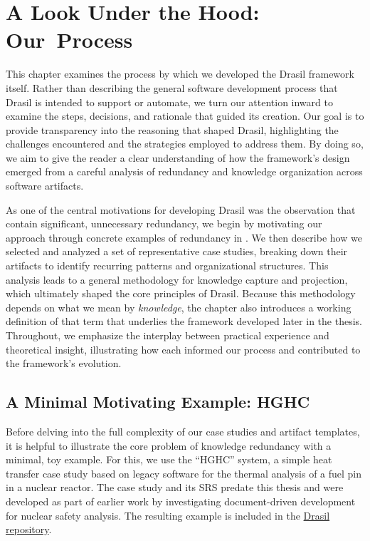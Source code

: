 \chapter{A Look Under the Hood: \mbox{Our Process}}
\label{c:process}

This chapter examines the process by which we developed the Drasil 
framework itself. Rather than describing the general software development 
process that Drasil is intended to support or automate, we turn our attention 
inward to examine the steps, decisions, and rationale that guided its creation. 
Our goal is to provide transparency into the reasoning that shaped Drasil, 
highlighting the challenges encountered and the strategies employed to address 
them. By doing so, we aim to give the reader a clear understanding of how the 
framework's design emerged from a careful analysis of redundancy and knowledge 
organization across software artifacts.

As one of the central motivations for developing Drasil was the observation 
that \sfs{} contain significant, unnecessary redundancy, we begin by motivating 
our approach through concrete examples of redundancy in \sfs{}. We then 
describe how we selected and analyzed a set of representative case studies, 
breaking down their artifacts to identify recurring patterns and organizational 
structures. This analysis leads to a general methodology for knowledge capture 
and projection, which ultimately shaped the core principles of Drasil. 
Because this methodology depends on what we mean by \emph{knowledge}, the 
chapter also introduces a working definition of that term that underlies the 
framework developed later in the thesis. 
Throughout, we emphasize the interplay between practical experience and 
theoretical insight, illustrating how each informed our process and contributed 
to the framework's evolution.

\section{A Minimal Motivating Example: HGHC}
\label{sec:hghc-mini}

Before delving into the full complexity of our case studies and artifact
templates, it is helpful to illustrate the core problem of knowledge redundancy
with a minimal, toy example. For this, we use the ``HGHC'' system, a simple heat
transfer case study based on legacy software for the thermal analysis of a fuel
pin in a nuclear reactor. The case study and its SRS predate this thesis and
were developed as part of earlier work by \citet{SmithAndKoothoor2016}
investigating document-driven development for nuclear safety analysis. The
resulting example is included in the
\href{https://www.github.com/jacquescarette/drasil}{Drasil repository}.

